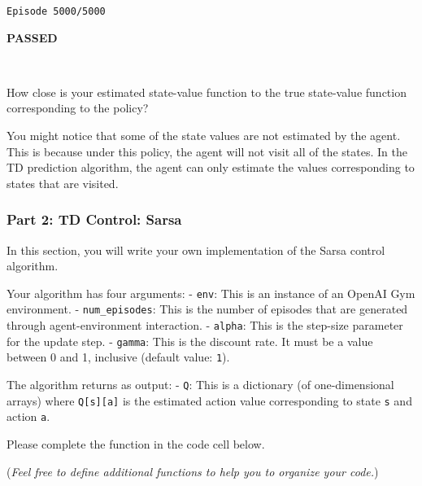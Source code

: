 \documentclass[11pt]{article}
\begin{document}
    \begin{Verbatim}[commandchars=\\\{\}]
Episode 5000/5000
    \end{Verbatim}

    \textbf{{PASSED}}

    
    \begin{center}
    \end{center}
    { \hspace*{\fill} \\}
    
    How close is your estimated state-value function to the true state-value
function corresponding to the policy?

You might notice that some of the state values are not estimated by the
agent. This is because under this policy, the agent will not visit all
of the states. In the TD prediction algorithm, the agent can only
estimate the values corresponding to states that are visited.

    \hypertarget{part-2-td-control-sarsa}{%
\subsubsection{Part 2: TD Control:
Sarsa}\label{part-2-td-control-sarsa}}

In this section, you will write your own implementation of the Sarsa
control algorithm.

Your algorithm has four arguments: - \texttt{env}: This is an instance
of an OpenAI Gym environment. - \texttt{num\_episodes}: This is the
number of episodes that are generated through agent-environment
interaction. - \texttt{alpha}: This is the step-size parameter for the
update step. - \texttt{gamma}: This is the discount rate. It must be a
value between 0 and 1, inclusive (default value: \texttt{1}).

The algorithm returns as output: - \texttt{Q}: This is a dictionary (of
one-dimensional arrays) where \texttt{Q{[}s{]}{[}a{]}} is the estimated
action value corresponding to state \texttt{s} and action \texttt{a}.

Please complete the function in the code cell below.

(\emph{Feel free to define additional functions to help you to organize
your code.})
\end{document}
